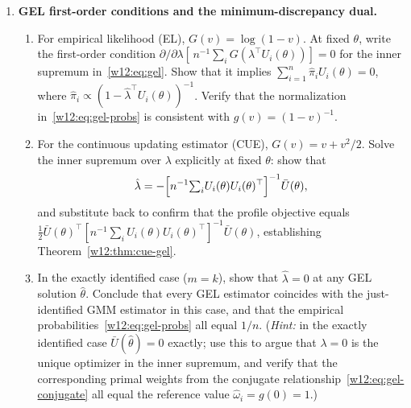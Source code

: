 \documentclass[master.tex]{subfiles}
\begin{document}
\begin{enumerate}
\item \textbf{GEL first-order conditions and the minimum-discrepancy
  dual.}
  \begin{enumerate}
    \item For empirical likelihood (EL), $G(v) = \log(1 - v)$.
      At fixed $\theta$, write the first-order condition
      $\partial/\partial\lambda[\,n^{-1}\sum_i G(\lambda^\top
      U_i(\theta))] = 0$ for the inner supremum in~\eqref{w12:eq:gel}.
      Show that it implies $\sum_{i=1}^n \hat\pi_i U_i(\theta) = 0$,
      where $\hat\pi_i \propto (1 - \hat\lambda^\top U_i(\theta))^{-1}$.
      Verify that the normalization in~\eqref{w12:eq:gel-probs} is
      consistent with $g(v) = (1-v)^{-1}$.
    \item For the continuous updating estimator (CUE), $G(v) =
      v + v^2/2$.  Solve the inner supremum over $\lambda$
      explicitly at fixed $\theta$: show that
      \[
        \hat\lambda
        = -\Bigl[n^{-1}{\textstyle\sum_i}
          U_i(\theta)U_i(\theta)^\top\Bigr]^{-1}\bar{U}(\theta),
      \]
      and substitute back to confirm that the profile objective
      equals $\tfrac{1}{2}\bar{U}(\theta)^\top
      [n^{-1}\sum_i U_i(\theta)U_i(\theta)^\top]^{-1}\bar{U}(\theta)$,
      establishing Theorem~\ref{w12:thm:cue-gel}.
    \item In the exactly identified case ($m = k$), show that
      $\hat\lambda = 0$ at any GEL solution $\hat\theta$.  Conclude
      that every GEL estimator coincides with the just-identified GMM
      estimator in this case, and that the empirical
      probabilities~\eqref{w12:eq:gel-probs} all equal $1/n$.
      (\emph{Hint:} in the exactly identified case
      $\bar{U}(\hat\theta) = 0$ exactly; use this to argue that
      $\lambda = 0$ is the unique optimizer in the inner supremum,
      and verify that the corresponding primal weights from the
      conjugate relationship~\eqref{w12:eq:gel-conjugate} all equal
      the reference value $\hat\omega_i = g(0) = 1$.)
  \end{enumerate}


\end{enumerate}
\end{document}
